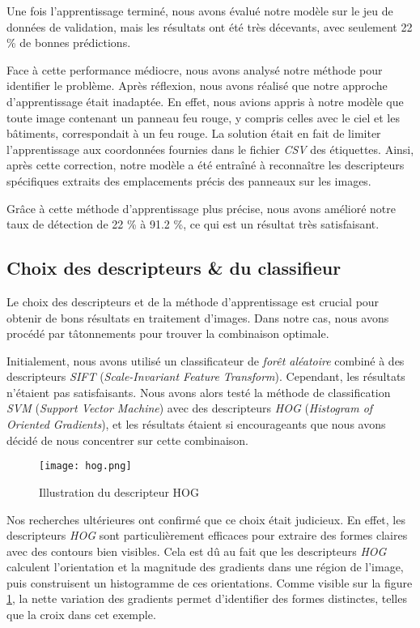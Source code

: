 \documentclass[twocolumn,10pt]{article}
\begin{document}
    Une fois l'apprentissage terminé, nous avons évalué notre modèle sur le jeu de données de validation, mais les résultats ont été très décevants, avec seulement 22 \% de bonnes prédictions.

    Face à cette performance médiocre, nous avons analysé notre méthode pour identifier le problème. Après réflexion, nous avons réalisé que notre approche d'apprentissage était inadaptée. En effet, nous avions appris à notre modèle que toute image contenant un panneau feu rouge, y compris celles avec le ciel et les bâtiments, correspondait à un feu rouge.
    La solution était en fait de limiter l'apprentissage aux coordonnées fournies dans le fichier \textit{CSV} des étiquettes. Ainsi, après cette correction, notre modèle a été entraîné à reconnaître les descripteurs spécifiques extraits des emplacements précis des panneaux sur les images.

    Grâce à cette méthode d'apprentissage plus précise, nous avons amélioré notre taux de détection de 22 \% à 91.2 \%, ce qui est un résultat très satisfaisant.

    \subsection{Choix des descripteurs \& du classifieur}
    Le choix des descripteurs et de la méthode d'apprentissage est crucial pour obtenir de bons résultats en traitement d'images. Dans notre cas, nous avons procédé par tâtonnements pour trouver la combinaison optimale.

    Initialement, nous avons utilisé un classificateur de \textit{forêt aléatoire} combiné à des descripteurs \textit{SIFT} (\textit{Scale-Invariant Feature Transform}). Cependant, les résultats n'étaient pas satisfaisants. Nous avons alors testé la méthode de classification \textit{SVM} (\textit{Support Vector Machine}) avec des descripteurs \textit{HOG} (\textit{Histogram of Oriented Gradients}), et les résultats étaient si encourageants que nous avons décidé de nous concentrer sur cette combinaison.
    \begin{figure}[H]
        \centering
        \texttt{[image: hog.png]}
        \caption{Illustration du descripteur HOG}
        \label{fig:descripteur-hog}
    \end{figure}

    Nos recherches ultérieures ont confirmé que ce choix était judicieux. En effet, les descripteurs \textit{HOG} sont particulièrement efficaces pour extraire des formes claires avec des contours bien visibles. Cela est dû au fait que les descripteurs \textit{HOG} calculent l'orientation et la magnitude des gradients dans une région de l'image, puis construisent un histogramme de ces orientations. Comme visible sur la figure \ref{fig:descripteur-hog}, la nette variation des gradients permet d'identifier des formes distinctes, telles que la croix dans cet exemple.
\end{document}
